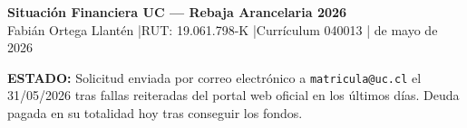 \documentclass[10pt,a4paper]{article}
\begin{document}
\begin{center}
  {\large\bfseries\color{ucblue}Situación Financiera UC --- Rebaja Arancelaria 2026}\\[2pt]
  {\small Fabián Ortega Llantén \quad|\quad RUT: 19.061.798-K \quad|\quad Currículum 040013 \quad| de mayo de 2026}
\end{center}

\vspace{3pt}

\begin{mdframed}[backgroundcolor=okgreen!10,linecolor=okgreen,linewidth=1pt,
    innertopmargin=3pt,innerbottommargin=3pt,innerleftmargin=5pt,innerrightmargin=5pt]
  {\small\textbf{\color{okgreen}ESTADO:} Solicitud enviada por correo electrónico a \texttt{matricula@uc.cl} el 31/05/2026 tras fallas reiteradas del portal web oficial en los últimos días. Deuda pagada en su totalidad hoy tras conseguir los fondos.}
\end{mdframed}

\vspace{5pt}
\end{document}
